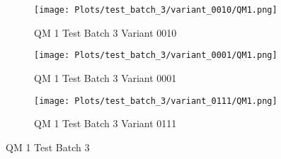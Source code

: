 \documentclass{DissertateFigs}
\begin{document}
\begin{figure}[t!]
\medskip

    \begin{subfigure}{0.47\textwidth}
    \texttt{[image: Plots/test\_batch\_3/variant\_0010/QM1.png]}
    \caption{QM 1 Test Batch 3 Variant 0010}
    \end{subfigure}
    \begin{subfigure}{0.47\textwidth}
    \texttt{[image: Plots/test\_batch\_3/variant\_0001/QM1.png]}
    \caption{QM 1 Test Batch 3 Variant 0001}
    \end{subfigure}

\medskip

    \begin{subfigure}{0.47\textwidth}
    \texttt{[image: Plots/test\_batch\_3/variant\_0111/QM1.png]}
    \caption{QM 1 Test Batch 3 Variant 0111}
    \end{subfigure}
\caption{QM 1 Test Batch 3}
    \end{figure}
\clearpage
\end{document}
